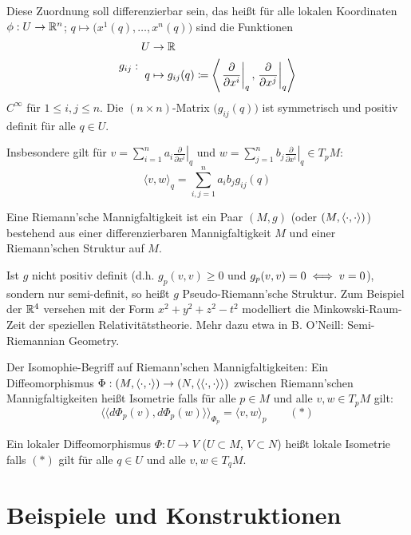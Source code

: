 \documentclass[a4paper,twoside,DIV15,BCOR12mm]{scrbook}
\begin{document}
Diese Zuordnung soll differenzierbar sein, das heißt für alle lokalen Koordinaten $\phi: U \to \mathbb{R}^n$; $q\mapsto \big(x^1(q), \ldots, x^n(q)\big)$ sind die Funktionen 
\[
g_{ij}:
\begin{aligned}
U &\to \MdR \\
q &\mapsto g_{ij}(q) \da \left\langle \left.\frac\partial{\partial x^i}\right|_q, \left.\frac\partial{\partial x^j}\right|_q\right\rangle
\end{aligned}
\]
$C^\infty$ für $1\le i,j\le n$. Die $(n\times n)$-Matrix $\big( g_{ij}(q)\big)$ ist symmetrisch und positiv definit für alle $q\in  U$.

Insbesondere gilt für $v = \sum_{i=1}^n a_i \left.\frac\partial{\partial x^i}\right|_q$ und $w = \sum_{j=1}^n b_j \left.\frac\partial{\partial x^i}\right|_q \in T_pM$:
\[ \langle v,w\rangle_q = \sum_{i,j=1}^n a_i b_j g_{ij}(q) \]

\begin{definition}
Eine Riemann’sche Mannigfaltigkeit ist ein Paar $(M,g)$ (oder $(M,\langle\cdot,\cdot\rangle)$) bestehend aus einer differenzierbaren Mannigfaltigkeit $M$ und einer Riemann’schen Struktur auf $M$.
\end{definition}

\begin{bemerkung}
Ist $g$ nicht positiv definit (d.h. $g_p(v,v)\ge 0$ und $g_p(v,v) = 0 \iff v=0$), sondern nur semi-definit, so heißt $g$ Pseudo-Riemann’sche Struktur. Zum Beispiel der $\mathbb{R}^4$ versehen mit der Form $x^2 + y^2 + z^2 - t^2$ modelliert die Minkowski-Raum-Zeit der speziellen Relativitätstheorie. Mehr dazu etwa in B. O’Neill: Semi-Riemannian Geometry.
\end{bemerkung}

Der Isomophie-Begriff auf Riemann’schen Mannigfaltigkeiten: Ein Diffeomorphismus $\Phi: (M,\langle\cdot,\cdot\rangle) \to (N,\langle\langle\cdot,\cdot\rangle\rangle)$ zwischen Riemann’schen Mannigfaltigkeiten heißt Isometrie falls für alle $p\in M$ und alle $v,w\in T_pM$ gilt:
\[ \langle\langle d\Phi_p(v), d\Phi_p(w) \rangle\rangle_{\Phi_{p}} = \langle v,w\rangle_p \qquad (*) \]

Ein lokaler Diffeomorphismus $\Phi: U \to V$ ($U\subset M$, $V\subset N$) heißt lokale Isometrie falls $(*)$ gilt für alle $q\in U$ und alle $v,w \in T_qM$.


\section{Beispiele und Konstruktionen}
\end{document}
